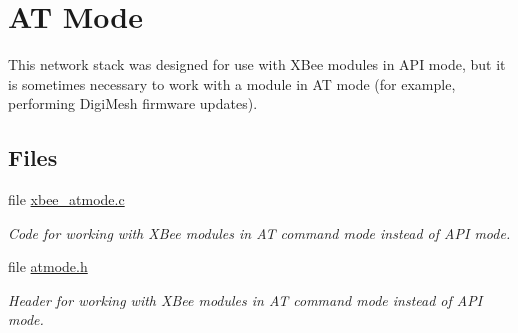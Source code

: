\hypertarget{group__xbee__atmode}{\section{A\-T Mode}
\label{group__xbee__atmode}
}


This network stack was designed for use with X\-Bee modules in A\-P\-I mode, but it is sometimes necessary to work with a module in A\-T mode (for example, performing Digi\-Mesh firmware updates).  


\subsection*{Files}
\begin{DoxyCompactItemize}
\item 
file \hyperlink{xbee__atmode_8c}{xbee\-\_\-atmode.\-c}
\begin{DoxyCompactList}\small\item\em Code for working with X\-Bee modules in A\-T command mode instead of A\-P\-I mode. \end{DoxyCompactList}\item 
file \hyperlink{atmode_8h}{atmode.\-h}
\begin{DoxyCompactList}\small\item\em Header for working with X\-Bee modules in A\-T command mode instead of A\-P\-I mode. \end{DoxyCompactList}\end{DoxyCompactItemize}
